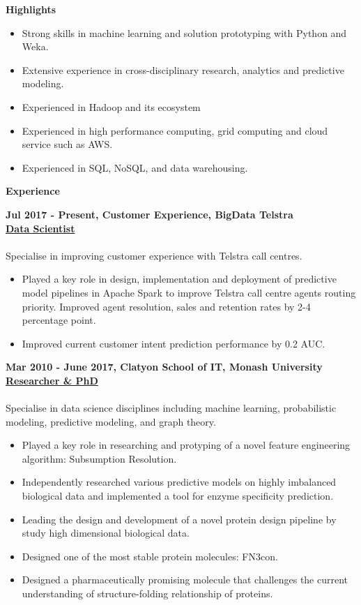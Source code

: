 \documentclass[a4paper,8pt,final]{memoir}
\newcommand{\Sep}{\vspace{1.5em}}
\newcommand{\SmallSep}{\vspace{0.5em}}
\newcommand{\CVSection}[1]
	{\Large\textbf{#1}\par
	\SmallSep\normalsize\normalfont}
\newcommand{\CVItem}[1]
	{\textbf{\color{RoyalBlue} #1}}
\begin{document}

\CVSection{Highlights}
    \begin{itemize}
        \item Strong skills in machine learning and solution prototyping with Python and Weka.
        \item Extensive experience in cross-disciplinary research, analytics and predictive modeling.
        \item Experienced in Hadoop and its ecosystem
        \item Experienced in high performance computing, grid computing and cloud service such as AWS.
        \item Experienced in SQL, NoSQL, and data warehousing.
    \end{itemize}
\Sep

\CVSection{Experience}

\CVItem{Jul 2017 - Present, Customer Experience, BigData Telstra}\\
\underline{\textbf{Data Scientist}}\\
\\
Specialise in improving customer experience with Telstra call centres.
    \begin{itemize}
        \item Played a key role in design, implementation and deployment of predictive model pipelines in Apache Spark to improve Telstra call centre agents routing priority. Improved agent resolution, sales and retention rates by 2-4 percentage point.
        \item Improved current customer intent prediction performance by 0.2 AUC.
    \end{itemize}
\Sep

\CVItem{Mar 2010 - June 2017, Clatyon School of IT, Monash University}\\
\underline{\textbf{Researcher \& PhD}}\\
\\
Specialise in data science disciplines including machine learning, probabilistic modeling, predictive modeling, and graph theory.
    \begin{itemize}
        \item Played a key role in researching and protyping of a novel feature engineering algorithm: Subsumption Resolution.
        \item Independently researched various predictive models on highly imbalanced biological data and implemented a tool for enzyme specificity prediction.
        \item Leading the design and development of a novel protein design pipeline by study high dimensional biological data.
        \item Designed one of the most stable protein molecules: FN3con.
        \item Designed a pharmaceutically promising molecule that challenges the current understanding of structure-folding relationship of proteins.
    \end{itemize}
\Sep
\end{document}
